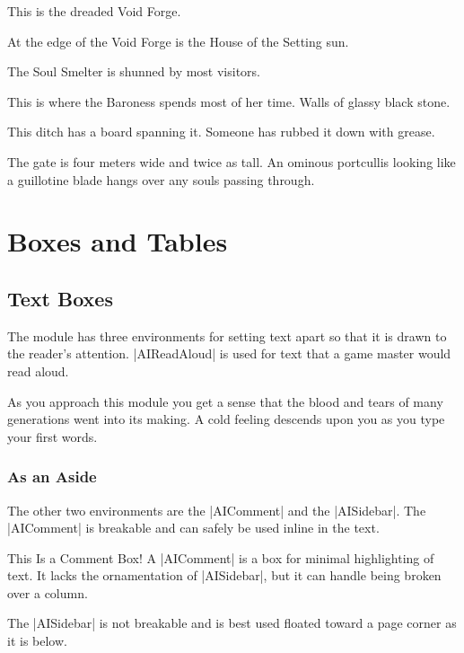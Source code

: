 \documentclass[letterpaper,twocolumn,openany,nodeprecatedcode]{astroinfernobook}
\begin{document}
This is the dreaded Void Forge.

At the edge of the Void Forge is the House of the Setting sun.

The Soul Smelter is shunned by most visitors.

This is where the Baroness spends most of her time. Walls of glassy black stone.

This ditch has a board spanning it. Someone has rubbed it down with grease.

The gate is four meters wide and twice as tall. An ominous portcullis looking like a guillotine blade hangs over any souls passing through.

\chapter{Boxes and Tables} \label{ch:text_boxes}

\section{Text Boxes}
The module has three environments for setting text apart so that it is drawn to the reader's attention. |AIReadAloud| is used for text that a game master would read aloud.

\begin{AIReadAloud}[colback=AIdarkbox] %
  As you approach this module you get a sense that the blood and tears of many generations went into its making. A cold feeling descends upon you as you type your first words.
\end{AIReadAloud}

\subsection{As an Aside}
The other two environments are the |AIComment| and the |AISidebar|. The |AIComment| is breakable and can safely be used inline in the text.

\begin{AIComment}{This Is a Comment Box!}
  A |AIComment| is a box for minimal highlighting of text. It lacks the ornamentation of |AISidebar|, but it can handle being broken over a column.
\end{AIComment}

The |AISidebar| is not breakable and is best used floated toward a page corner as it is below.
\end{document}
